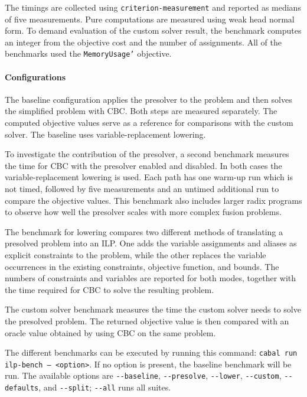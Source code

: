 The timings are collected using \texttt{criterion-measurement} and reported as medians of five measurements.
Pure computations are measured using weak head normal form.
To demand evaluation of the custom solver result, the benchmark computes an integer from the objective cost and the number of assignments.
All of the benchmarks used the \texttt{MemoryUsage'} objective.

\paragraph{Configurations}

The baseline configuration applies the presolver to the problem and then solves the simplified problem with CBC.
Both steps are measured separately.
The computed objective values serve as a reference for comparisons with the custom solver.
The baseline uses variable-replacement lowering.

To investigate the contribution of the presolver, a second benchmark measures the time for CBC with the presolver enabled and disabled.
In both cases the variable-replacement lowering is used.
Each path has one warm-up run which is not timed, followed by five measurements and an untimed additional run to compare the objective values.
This benchmark also includes larger radix programs to observe how well the presolver scales with more complex fusion problems.

The benchmark for lowering compares two different methods of translating a presolved problem into an ILP.
One adds the variable assignments and aliases as explicit constraints to the problem, while the other replaces the variable occurrences in the existing constraints, objective function, and bounds.
The numbers of constraints and variables are reported for both modes, together with the time required for CBC to solve the resulting problem.

The custom solver benchmark measures the time the custom solver needs to solve the presolved problem.
The returned objective value is then compared with an oracle value obtained by using CBC on the same problem.

The different benchmarks can be executed by running this command: \texttt{cabal run ilp-bench -- <option>}.
If no option is present, the baseline benchmark will be run.
The available options are \texttt{-{}-baseline},
\texttt{-{}-presolve},
\texttt{-{}-lower},
\texttt{-{}-custom},
\texttt{-{}-defaults},
and \texttt{-{}-split};
\texttt{-{}-all} runs all suites.



